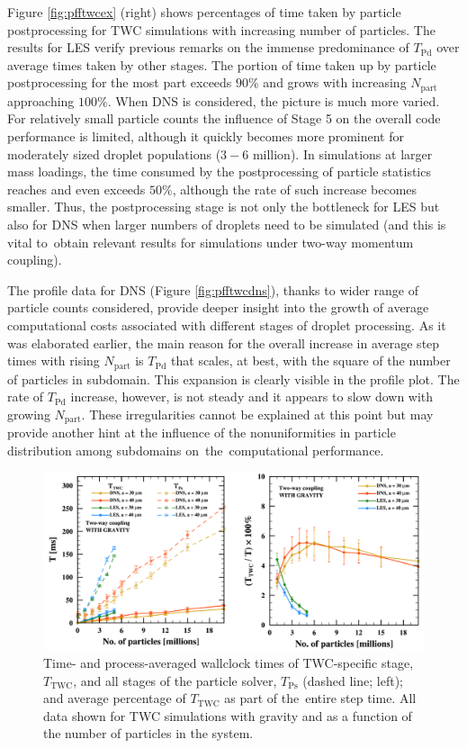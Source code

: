 \documentclass{pracamgren}
\begin{document}
Figure \ref{fig:pfftwcex} (right) shows percentages of time taken by particle postprocessing for TWC simulations with increasing number of particles.
The results for LES verify previous remarks on the immense predominance of $T_{\text{Pd}}$ over average times taken by other stages.
The portion of time taken up by particle postprocessing for the most part exceeds $90 \%$ and grows with increasing $N_{\text{part}}$ approaching $100 \%$.
When DNS is considered, the picture is much more varied.
For relatively small particle counts the influence of Stage 5 on the overall code performance is limited, although it quickly becomes more prominent for moderately sized droplet populations ($3-6$ million).
In simulations at larger mass loadings, the time consumed by the postprocessing of particle statistics reaches and even exceeds $50 \%$, although the rate of such increase becomes smaller.
Thus, the postprocessing stage is not only the bottleneck for LES but also for DNS when larger numbers of droplets need to be simulated (and this is vital to~obtain relevant results for simulations under two-way momentum coupling).  

The profile data for DNS (Figure \ref{fig:pfftwcdns}), thanks to wider range of particle counts considered, provide deeper insight into the growth of average computational costs associated with different stages of droplet processing.
As it was elaborated earlier, the main reason for the overall increase in average step times with rising $N_{\text{part}}$ is $T_{\text{Pd}}$ that scales, at best, with the square of the number of particles in subdomain.
This expansion is clearly visible in the profile plot.
The rate of $T_{\text{Pd}}$ increase, however, is not steady and it appears to slow down with growing $N_{\text{part}}$.
These irregularities cannot be explained at this point but may provide another hint at the influence of the nonuniformities in particle distribution among subdomains on~the~computational performance.

\begin{figure}[h]
\centering
\includegraphics[width=13.5cm]{img/plots/3-3e-pfftwctwc.pdf}
\caption{
Time- and process-averaged wallclock times of TWC-specific stage, $T_{\text{TWC}}$, and all stages of the particle solver, $T_{\text{Ps}}$ (dashed line; left); and average percentage of $T_{\text{TWC}}$ as part of the~entire step time.
All data shown for TWC simulations with gravity and as a function of the number of particles in the system.
}
\label{fig:pfftwctwc}
\end{figure}
\end{document}
